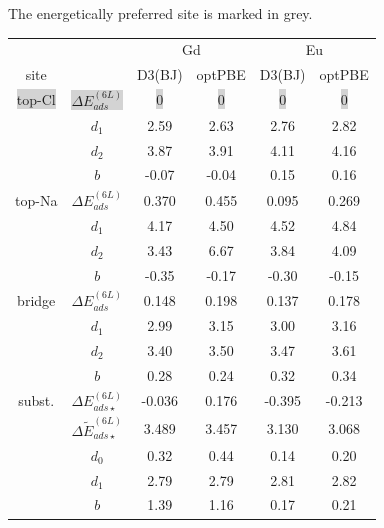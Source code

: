 {\begin{table}[b]
{The energetically preferred site is marked in grey.
}
\renewcommand{\arraystretch}{1.7}
\begin{ruledtabular}
 \begin{tabular}{c c     c  c | c c}
         &          & \multicolumn{2}{c|}{Gd}      & \multicolumn{2}{c}{Eu} \\
 site    &          &  D3(BJ)  &   optPBE          & D3(BJ)  &   optPBE     \\
\hline
\colorbox{lightgray}{{ top-Cl}}   & \colorbox{lightgray}{ ${ \Delta E^{(6L)}_{ads} }$}   &   \colorbox{lightgray}{{ 0}}      &  \colorbox{lightgray}{{ 0}}   &   \colorbox{lightgray}{{ 0}}   &   \colorbox{lightgray}{{ 0}}    \\
         &  $d_1$   &  2.59    &  2.63    &   2.76   &  2.82          \\
         &  $d_2$   &  3.87    &  3.91    &   4.11   &  4.16          \\
         &  $b$     & -0.07    & -0.04    &   0.15   &  0.16          \\
\hline
top-Na   &  $\Delta E^{(6L)}_{ads}$   &   0.370  &  0.455  &  0.095   &  0.269    \\
         &  $d_1$   &  4.17   &   4.50    &   4.52   &  4.84           \\
         &  $d_2$   &  3.43   &   6.67    &   3.84   &  4.09           \\
         &  $b$     & -0.35   &  -0.17    &  -0.30   & -0.15           \\
\hline
bridge   &  $\Delta E^{(6L)}_{ads}$  &   0.148  &  0.198  &  0.137   &   0.178   \\
         &  $d_1$   &  2.99   &   3.15    &   3.00   &  3.16           \\
         &  $d_2$   &  3.40   &   3.50    &   3.47   &  3.61           \\
         &  $b$     &  0.28   &   0.24    &   0.32   &  0.34           \\
\hline
subst.   &  $\Delta E_{ads\star}^{(6L)}$  &  -0.036  &  0.176   & -0.395  & -0.213    \\
         &  $\Delta \tilde E_{ads\star}^{(6L)}$           &  3.489   &  3.457   & 3.130  & 3.068    \\

         &  $d_0$   &  0.32   &   0.44    &   0.14   &  0.20           \\
         &  $d_1$   &  2.79   &   2.79    &   2.81   &  2.82           \\
         &  $b$     &  1.39   &   1.16    &   0.17   &  0.21           \\
 \end{tabular}
\end{ruledtabular}
\label{tab:DeltaE_geom_6l}
\end{table}



}
